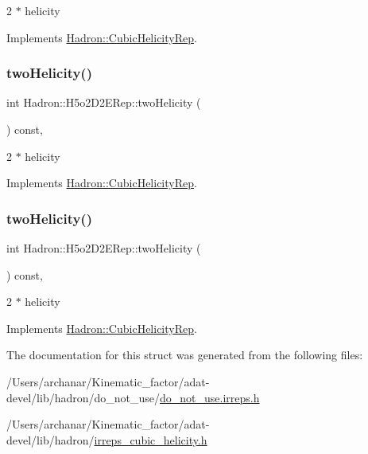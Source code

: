 2 $\ast$ helicity 

Implements \mbox{\hyperlink{structHadron_1_1CubicHelicityRep_af507aa56fc2747eacc8cb6c96db31ecc}{Hadron\+::\+Cubic\+Helicity\+Rep}}.

\mbox{\label{structHadron_1_1H5o2D2ERep_a8a929124bb0b88a9f8c8c8a04e633baa}} 
\subsubsection{\texorpdfstring{twoHelicity()}{twoHelicity()}\hspace{0.1cm}{\footnotesize\ttfamily [2/3]}}
{\footnotesize\ttfamily int Hadron\+::\+H5o2\+D2\+E\+Rep\+::two\+Helicity (\begin{DoxyParamCaption}{ }\end{DoxyParamCaption}) const\hspace{0.3cm}{\ttfamily [inline]}, {\ttfamily [virtual]}}

2 $\ast$ helicity 

Implements \mbox{\hyperlink{structHadron_1_1CubicHelicityRep_af507aa56fc2747eacc8cb6c96db31ecc}{Hadron\+::\+Cubic\+Helicity\+Rep}}.

\mbox{\label{structHadron_1_1H5o2D2ERep_a8a929124bb0b88a9f8c8c8a04e633baa}} 
\subsubsection{\texorpdfstring{twoHelicity()}{twoHelicity()}\hspace{0.1cm}{\footnotesize\ttfamily [3/3]}}
{\footnotesize\ttfamily int Hadron\+::\+H5o2\+D2\+E\+Rep\+::two\+Helicity (\begin{DoxyParamCaption}{ }\end{DoxyParamCaption}) const\hspace{0.3cm}{\ttfamily [inline]}, {\ttfamily [virtual]}}

2 $\ast$ helicity 

Implements \mbox{\hyperlink{structHadron_1_1CubicHelicityRep_af507aa56fc2747eacc8cb6c96db31ecc}{Hadron\+::\+Cubic\+Helicity\+Rep}}.



The documentation for this struct was generated from the following files\+:\begin{DoxyCompactItemize}
\item 
/\+Users/archanar/\+Kinematic\+\_\+factor/adat-\/devel/lib/hadron/do\+\_\+not\+\_\+use/\mbox{\hyperlink{adat-devel_2lib_2hadron_2do__not__use_2do__not__use_8irreps_8h}{do\+\_\+not\+\_\+use.\+irreps.\+h}}\item 
/\+Users/archanar/\+Kinematic\+\_\+factor/adat-\/devel/lib/hadron/\mbox{\hyperlink{adat-devel_2lib_2hadron_2irreps__cubic__helicity_8h}{irreps\+\_\+cubic\+\_\+helicity.\+h}}\end{DoxyCompactItemize}
